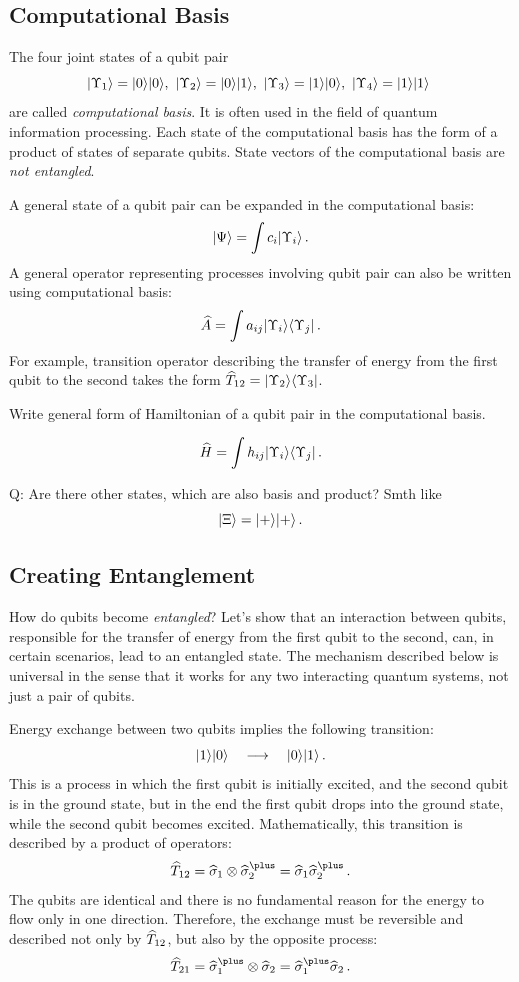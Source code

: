 \subsection{Computational Basis}
The four joint states of a qubit pair
\[
|{\Upsilon_1}\rangle = |{0}\rangle|{0}\rangle,\,\,|{\Upsilon_2}\rangle = |{0}\rangle|{1}\rangle,\,\,
|{\Upsilon_3}\rangle = |{1}\rangle|{0}\rangle,\,\,|{\Upsilon_4}\rangle = |{1}\rangle|{1}\rangle\
\]
are called \emph{computational basis}. It is often used in the field of quantum information processing.
Each state of the computational basis has the form of a product of states of separate qubits. State vectors of the computational basis are \emph{not entangled}.

A general state of a qubit pair can be expanded in the computational basis:
\[
|{\Psi}\rangle = \int c_i|{\Upsilon_i}\rangle\,.
\]
A general operator representing processes involving qubit pair can also be written using computational basis:
\[
	\widehat{A}=\int a_{ij}|{\Upsilon_i}\rangle\langle{\Upsilon_j}|\,.
\]
For example, transition operator describing the transfer of energy from the first qubit to the second takes the form $\widehat{T}_{12}=|{\Upsilon_2}\rangle\langle{\Upsilon_3}|$.

\begin{exercise}
	Write general form of Hamiltonian of a qubit pair in the computational basis. 
	
	\[
	\widehat{H}=\int h_{ij}|{\Upsilon_i}\rangle\langle{\Upsilon_j}|\,.
	\]
\end{exercise}

Q: Are there other states, which are also basis and product? Smth like
\[
|{\Xi}\rangle=|{+}\rangle|{+}\rangle\,.
\]

\subsection{Creating Entanglement}
How do qubits become \emph{entangled}? Let's show that an interaction between qubits, responsible for the transfer of energy from the first qubit to the second, can, in certain scenarios, lead to an entangled state. The mechanism described below is universal in the sense that it works for any two interacting quantum systems, not just a pair of qubits.

Energy exchange between two qubits implies the following transition:
\[
|{1}\rangle|{0}\rangle\quad\longrightarrow\quad|{0}\rangle|{1}\rangle\,.
\]
This is a process in which the first qubit is initially excited, and the second qubit is in the ground state, but in the end the first qubit drops into the ground state, while the second qubit becomes excited. Mathematically, this transition is described by a product of operators:
\[
\op{T}_{12} = \op{\sigma}_1\otimes \op{\sigma}^\plus_2 = \op{\sigma}_1\op{\sigma}^\plus_2\,.
\]
The qubits are identical and there is no fundamental reason for the energy to flow only in one direction. Therefore, the exchange must be reversible and described not only by $\widehat{T}_{12}$, but also by the opposite process:
\[
\op{T}_{21} = \op{\sigma}^\plus_1\otimes \op{\sigma}_2 = \op{\sigma}^\plus_1\op{\sigma}_2\,.
\]

